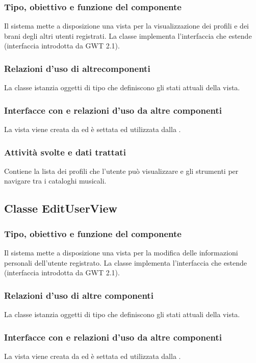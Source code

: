 \subsubsection*{Tipo, obiettivo e funzione del componente}
Il sistema mette a disposizione una vista per la visualizzazione dei profili e
dei brani degli altri utenti registrati. La classe 
implementa l'interfaccia  che estende 
(interfaccia introdotta da GWT 2.1).
\subsubsection*{Relazioni d'uso di altrecomponenti} 
La classe istanzia oggetti di tipo  che definiscono gli stati
attuali della vista.
\subsubsection*{Interfacce con e relazioni d'uso da altre componenti}
 La vista viene creata da  ed \`e settata ed utilizzata dalla
 .
 \subsubsection*{Attivit\`a svolte e dati trattati}
Contiene la lista dei profili che l'utente pu\`o visualizzare e gli strumenti
per navigare tra i cataloghi musicali.

\subsection{Classe EditUserView}
\subsubsection*{Tipo, obiettivo e funzione del componente}
Il sistema mette a disposizione una vista per la
modifica delle informazioni personali dell'utente registrato. La classe
 implementa l'interfaccia  che estende
 (interfaccia introdotta da GWT 2.1).

\subsubsection*{Relazioni d'uso di altre componenti}
La classe istanzia oggetti di tipo  che definiscono gli stati
attuali della vista.
\subsubsection*{Interfacce con e relazioni d'uso da altre componenti}
La vista viene creata da  ed \`e settata ed utilizzata dalla
.
